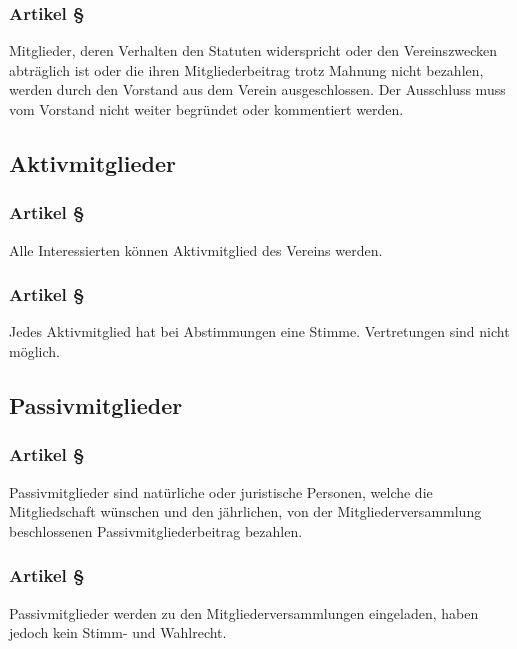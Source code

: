 \subsubsection*{Artikel §\articlenumber}
Mitglieder, deren Verhalten den Statuten widerspricht oder den Vereinszwecken
abträglich ist oder die ihren Mitgliederbeitrag trotz Mahnung nicht bezahlen,
werden durch den Vorstand aus dem Verein ausgeschlossen. Der Ausschluss muss
vom Vorstand nicht weiter begründet oder kommentiert werden.

\subsection{Aktivmitglieder}

\subsubsection*{Artikel §\articlenumber}
Alle Interessierten können Aktivmitglied des Vereins werden.

\subsubsection*{Artikel §\articlenumber}
Jedes Aktivmitglied hat bei Abstimmungen eine Stimme. Vertretungen sind nicht
möglich.

\subsection{Passivmitglieder}


\subsubsection*{Artikel §\articlenumber}
Passivmitglieder sind natürliche oder juristische Personen, welche die
Mitgliedschaft wünschen und den jährlichen, von der Mitgliederversammlung
beschlossenen Passivmitgliederbeitrag bezahlen.

\subsubsection*{Artikel §\articlenumber}
Passivmitglieder werden zu den Mitgliederversammlungen  eingeladen, haben
jedoch kein Stimm- und Wahlrecht.

